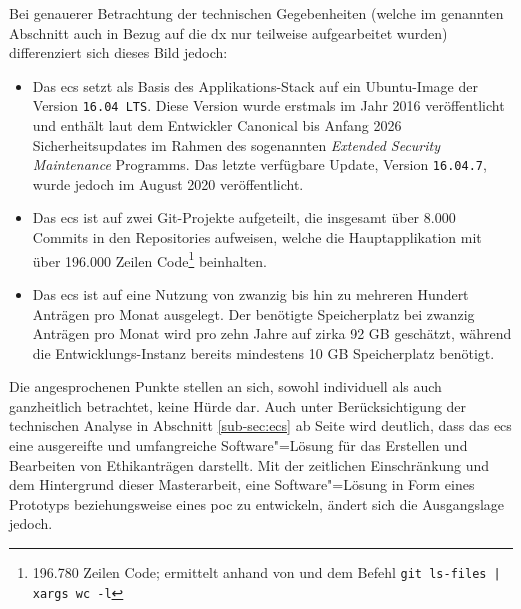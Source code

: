 \documentclass[a4paper,12pt,twoside,numbers=noendperiod]{scrreprt}
\begin{document}
Bei genauerer Betrachtung der technischen Gegebenheiten (welche im genannten Abschnitt auch in Bezug auf die \ac{dx} nur teilweise aufgearbeitet wurden) differenziert sich dieses Bild jedoch:
\begin{itemize}
    \item Das \ac{ecs} setzt als Basis des Applikations-Stack auf ein Ubuntu-Image der Version \texttt{16.04 LTS}. Diese Version wurde erstmals im Jahr 2016 veröffentlicht und enthält laut dem Entwickler Canonical bis Anfang 2026 Sicherheitsupdates im Rahmen des sogenannten \textit{Extended Security Maintenance} Programms. Das letzte verfügbare Update, Version \texttt{16.04.7}, wurde jedoch im August 2020 veröffentlicht. \cite{medizinische_universitat_wien_ecs-handbook_development-2021, canonical_ltd_ubuntu_2023, canonical_ltd_ubuntu_2023-1}
    \item Das \ac{ecs} ist auf zwei Git-Projekte aufgeteilt, die insgesamt über 8.000 Commits in den Repositories aufweisen, welche die Hauptapplikation mit über 196.000 Zeilen Code\footnote{196.780 Zeilen Code; ermittelt anhand von \cite{ethics_commission_system_organization_ecs_2021} und dem Befehl \texttt{git ls-files | xargs wc -l}} beinhalten. \cite{medizinische_universitat_wien_development_2021, ethics_commission_system_organization_ecs_2021, ethics_commission_system_organization_ecs-appliance_2021}
    \item Das \ac{ecs} ist auf eine Nutzung von zwanzig bis hin zu mehreren Hundert Anträgen pro Monat ausgelegt. Der benötigte Speicherplatz bei zwanzig Anträgen pro Monat wird pro zehn Jahre auf zirka 92 GB geschätzt, während die Entwicklungs-Instanz bereits mindestens 10 GB Speicherplatz benötigt. \cite{medizinische_universitat_wien_ecs-handbook_requirements-2021, ethics_commission_system_organization_ecs_2021}
\end{itemize}

Die angesprochenen Punkte stellen an sich, sowohl individuell als auch ganzheitlich betrachtet, keine Hürde dar. Auch unter Berücksichtigung der technischen Analyse in Abschnitt \ref{sub-sec:ecs} ab Seite \pageref{sub-sec:ecs} wird deutlich, dass das \acl{ecs} eine ausgereifte und umfangreiche Software"=Lösung für das Erstellen und Bearbeiten von Ethikanträgen darstellt. Mit der zeitlichen Einschränkung und dem Hintergrund dieser Masterarbeit, eine Software"=Lösung in Form eines Prototyps beziehungsweise eines \ac{poc} zu entwickeln, ändert sich die Ausgangslage jedoch.
\end{document}
